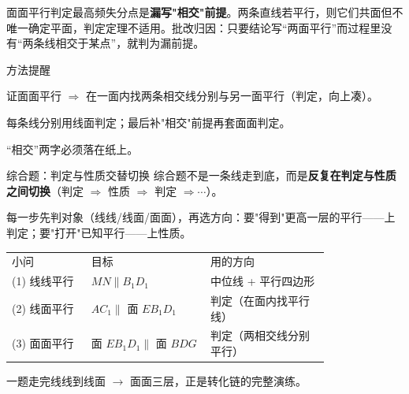 \documentclass{exam-zh}
\begin{document}
\begin{eduMistakeBox}
面面平行判定最高频失分点是\textbf{漏写"相交"前提}。两条直线若平行，则它们共面但不唯一确定平面，判定定理不适用。批改归因：只要结论写“两面平行”而过程里没有“两条线相交于某点”，就判为漏前提。
\end{eduMistakeBox}




\begin{eduSummaryBlock}{\eduIconPin}{方法提醒}
\begin{eduBulletList}
  \item 证面面平行 $\Rightarrow$ 在一面内找两条相交线分别与另一面平行（判定，向上凑）。  \item 每条线分别用线面判定；最后补"相交"前提再套面面判定。  \item “相交”两字必须落在纸上。\end{eduBulletList}
\end{eduSummaryBlock}



\clearpage
{}


\begin{eduSolutionBox}{综合题：判定与性质交替切换}
  \begingroup
  \setlength{\parskip}{2.5mm}
综合题不是一条线走到底，而是\textbf{反复在判定与性质之间切换}（判定 $\Rightarrow$ 性质 $\Rightarrow$ 判定 $\Rightarrow \cdots$）。\par
每一步先判对象（线线/线面/面面），再选方向：要"得到"更高一层的平行——上判定；要"打开"已知平行——上性质。\par
\begin{tabular}{p{0.20\linewidth}p{0.30\linewidth}p{0.30\linewidth}}
小问 & 目标 & 用的方向\\
(1) 线线平行 & $MN\parallel B_{1}D_{1}$ & 中位线 + 平行四边形\\
(2) 线面平行 & $AC_{1}\parallel$ 面 $EB_{1}D_{1}$ & 判定（在面内找平行线）\\
(3) 面面平行 & 面 $EB_{1}D_{1}\parallel$ 面 $BDG$ & 判定（两相交线分别平行）\\
\end{tabular}
\par
一题走完线线到线面 $\to$ 面面三层，正是转化链的完整演练。\par
  \endgroup
\end{eduSolutionBox}
\end{document}
